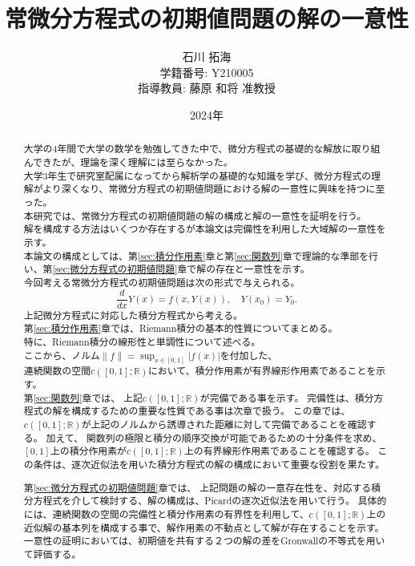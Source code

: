 \documentclass[a4paper]{article}
\begin{document}
\title{常微分方程式の初期値問題の解の一意性}

\author{石川 拓海 \\ 学籍番号: Y210005 \\ 指導教員: 藤原 和将 准教授}
\date{2024年}
\maketitle
\begin{abstract}
    大学の4年間で大学の数学を勉強してきた中で、微分方程式の基礎的な解放に取り組んできたが、理論を深く理解には至らなかった。\\
    大学3年生で研究室配属になってから解析学の基礎的な知識を学び、微分方程式の理解がより深くなり、常微分方程式の初期値問題における解の一意性に興味を持つに至った。\\
    本研究では、常微分方程式の初期値問題の解の構成と解の一意性を証明を行う。\\
    解を構成する方法はいくつか存在するが本論文は完備性を利用した大域解の一意性を示す。\\
    本論文の構成としては、第\ref{sec:積分作用素}章と第\ref{sec:関数列}章で理論的な準部を行い、第\ref{sec:微分方程式の初期値問題}章で解の存在と一意性を示す。\\
    今回考える常微分方程式の初期値問題は次の形式で与えられる。\\
        \[
        \frac{d}{dx}Y(x)=f(x, Y(x)),
        \quad Y(x_{0})=Y_{0}.
        \]
    上記微分方程式に対応した積分方程式から考える。\\

    第\ref{sec:積分作用素}章では、Riemann積分の基本的性質についてまとめる。\\
    特に、Riemann積分の線形性と単調性について述べる。\\
    ここから、ノルム$\|f\|=\sup_{x \in [0,1]}|f(x)|$を付加した、\\
    連続関数の空間$c([0,1];\mathbb{R})$において、積分作用素が有界線形作用素であることを示す。\\

    第\ref{sec:関数列}章では、
    上記$c([0,1];\mathbb{R})$が完備である事を示す。
    完備性は、積分方程式の解を構成するための重要な性質である事は次章で扱う。
    この章では、
    $c([0,1];\mathbb{R})$が上記のノルムから誘導された距離に対して完備であることを確認する。
    加えて、
    関数列の極限と積分の順序交換が可能であるための十分条件を求め、
    $[0,1]$上の積分作用素が$c([0,1];\mathbb{R})$上の有界線形作用素であることを確認する。
    この条件は、逐次近似法を用いた積分方程式の解の構成において重要な役割を果たす。

    第\ref{sec:微分方程式の初期値問題}章では、
    上記問題の解の一意存在性を、対応する積分方程式を介して検討する、解の構成は、Picardの逐次近似法を用いて行う。
    具体的には、連続関数の空間の完備性と積分作用素の有界性を利用して、$c([0,1];\mathbb{R})$上の近似解の基本列を構成する事で、解作用素の不動点として解が存在することを示す。
    一意性の証明においては、初期値を共有する２つの解の差をGronwallの不等式を用いて評価する。
\end{abstract}
\end{document}
